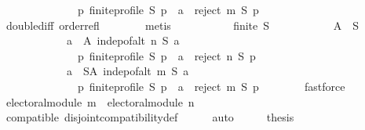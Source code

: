 \begin{isabellebody}
\ \ \ \ \ \ \ \ \ \ \ \ \ \ {\isacharparenleft}{\kern0pt}{\isasymforall}p{\isachardot}{\kern0pt}\ finite{\isacharunderscore}{\kern0pt}profile\ S\ p\ {\isasymlongrightarrow}\ a\ {\isasymin}\ reject\ m\ S\ p{\isacharparenright}{\kern0pt}{\isacharparenright}{\kern0pt}{\isacharparenright}{\kern0pt}{\isachardoublequoteclose}\isanewline
\ \ \ \ \ \ \isamarkupfalse%
\ double{\isacharunderscore}{\kern0pt}diff\ order{\isacharunderscore}{\kern0pt}refl\isanewline
\ \ \ \ \ \ \isamarkupfalse%
\ metis\isanewline
\ \ \ \ \isamarkupfalse%
\isanewline
\ \ \ \ \ \ {\isachardoublequoteopen}finite\ S\ {\isasymlongrightarrow}\isanewline
\ \ \ \ \ \ \ \ \ \ {\isacharparenleft}{\kern0pt}{\isasymexists}A\ {\isasymsubseteq}\ S{\isachardot}{\kern0pt}\isanewline
\ \ \ \ \ \ \ \ \ \ \ \ {\isacharparenleft}{\kern0pt}{\isasymforall}a\ {\isasymin}\ A{\isachardot}{\kern0pt}\ indep{\isacharunderscore}{\kern0pt}of{\isacharunderscore}{\kern0pt}alt\ n\ S\ a\ {\isasymand}\isanewline
\ \ \ \ \ \ \ \ \ \ \ \ \ \ {\isacharparenleft}{\kern0pt}{\isasymforall}p{\isachardot}{\kern0pt}\ finite{\isacharunderscore}{\kern0pt}profile\ S\ p\ {\isasymlongrightarrow}\ a\ {\isasymin}\ reject\ n\ S\ p{\isacharparenright}{\kern0pt}{\isacharparenright}{\kern0pt}\ {\isasymand}\isanewline
\ \ \ \ \ \ \ \ \ \ \ \ {\isacharparenleft}{\kern0pt}{\isasymforall}a\ {\isasymin}\ S{\isacharminus}{\kern0pt}A{\isachardot}{\kern0pt}\ indep{\isacharunderscore}{\kern0pt}of{\isacharunderscore}{\kern0pt}alt\ m\ S\ a\ {\isasymand}\isanewline
\ \ \ \ \ \ \ \ \ \ \ \ \ \ {\isacharparenleft}{\kern0pt}{\isasymforall}p{\isachardot}{\kern0pt}\ finite{\isacharunderscore}{\kern0pt}profile\ S\ p\ {\isasymlongrightarrow}\ a\ {\isasymin}\ reject\ m\ S\ p{\isacharparenright}{\kern0pt}{\isacharparenright}{\kern0pt}{\isacharparenright}{\kern0pt}{\isachardoublequoteclose}\isanewline
\ \ \ \ \ \ \isamarkupfalse%
\ fastforce\isanewline
\ \ \isamarkupfalse%
\isanewline
\ \ \isamarkupfalse%
\ \isamarkupfalse%
\ {\isachardoublequoteopen}electoral{\isacharunderscore}{\kern0pt}module\ m\ {\isasymand}\ electoral{\isacharunderscore}{\kern0pt}module\ n{\isachardoublequoteclose}\isanewline
\ \ \ \ \isamarkupfalse%
\ compatible\ disjoint{\isacharunderscore}{\kern0pt}compatibility{\isacharunderscore}{\kern0pt}def\isanewline
\ \ \ \ \isamarkupfalse%
\ auto\isanewline
\ \ \isamarkupfalse%
\ \isamarkupfalse%
\ {\isacharquery}{\kern0pt}thesis\isanewline
\ \ \ \ \isamarkupfalse%

\end{isabellebody}
